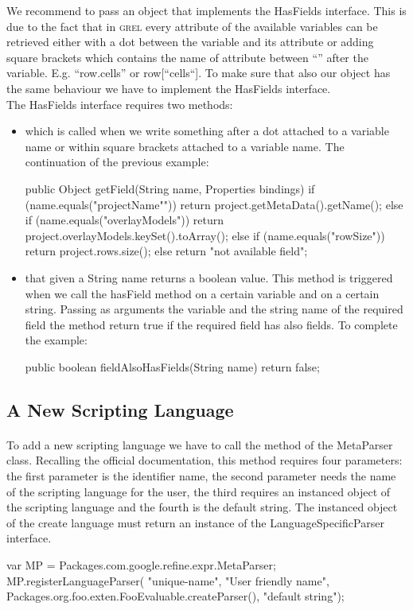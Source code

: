We recommend to pass an object that implements the HasFields interface. This is due to the fact that in \textsc{grel} every attribute of the available variables can be retrieved either with a dot between the variable and its attribute or adding square brackets which contains the name of attribute between ``'' after the variable. E.g. ``row.cells'' or row[``cells``]. To make sure that also our object has the same behaviour we have to implement the HasFields interface.\\
The HasFields interface requires two methods:
\begin{itemize}
	\item {} which is called when we write something after a dot attached to a variable name or within square brackets attached to a variable name. The continuation of the previous example:
	\begin{code}
public Object getField(String name, Properties bindings) {
   if (name.equals("projectName""))
      return project.getMetaData().getName();
   else if (name.equals("overlayModels"))
      return project.overlayModels.keySet().toArray();
   else if (name.equals("rowSize"))
      return project.rows.size();
   else 
      return "not available field";
}
	\end{code}
	\item {} that given a String name returns a boolean value. This method is triggered when we call the hasField method on a certain variable and on a certain string. Passing as arguments the variable and the string name of the required field the method return true if the required field has also fields. To complete the example:
	\begin{code}
public boolean fieldAlsoHasFields(String name) {
   return false;}	
	\end{code}
\end{itemize}


\subsection{A New Scripting Language}
\paragraph{}
To add a new scripting language we have to call the  method of the MetaParser class. Recalling the official documentation, this method requires four parameters: the first parameter is the identifier name, the second parameter needs the name of the scripting language for the user, the third requires an instanced object of the scripting language and the fourth is the default string. The instanced object of the create language must return an instance of the LanguageSpecificParser interface.
\begin{code}
var MP = Packages.com.google.refine.expr.MetaParser;
MP.registerLanguageParser(
   "unique-name",
   "User friendly name",
   Packages.org.foo.exten.FooEvaluable.createParser(),
   "default string");
\end{code}

